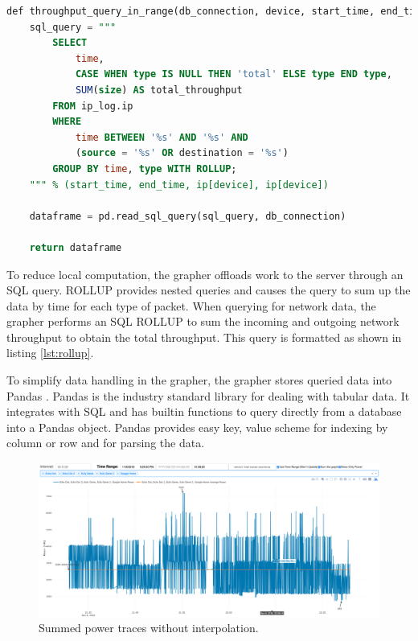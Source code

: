 \noindent
\begin{minipage}{\textwidth}
    \begin{lstlisting}[language=SQL, label={lst:rollup},caption={Efficient SQL query to obtain total Network throughput at each second.}]
    def throughput_query_in_range(db_connection, device, start_time, end_time):
    sql_query = """
        SELECT
            time,
            CASE WHEN type IS NULL THEN 'total' ELSE type END type,
            SUM(size) AS total_throughput
        FROM ip_log.ip
        WHERE
            time BETWEEN '%s' AND '%s' AND
            (source = '%s' OR destination = '%s')
        GROUP BY time, type WITH ROLLUP;
    """ % (start_time, end_time, ip[device], ip[device])

    dataframe = pd.read_sql_query(sql_query, db_connection)

    return dataframe
    \end{lstlisting}
\end{minipage}

To reduce local computation, the grapher offloads work to the server through an SQL query. ROLLUP provides nested queries and causes the query to sum up the data by time for each type of packet. When querying for network data, the grapher performs an SQL ROLLUP to sum the incoming and outgoing network throughput to obtain the total throughput. This query is formatted as shown in listing \ref{lst:rollup}.

To simplify data handling in the grapher, the grapher stores queried data into Pandas \cite{pandas}. Pandas is the industry standard library for dealing with tabular data. It integrates with SQL and has builtin functions to query directly from a database into a Pandas object. Pandas provides easy key, value scheme for indexing by column or row and for parsing the data.

\begin{figure}[H]
    \centering
    \includegraphics[width=1\textwidth]{figures/noninterpolated.png}
    \caption{Summed power traces without interpolation.}
    \label{fig:noninterpolated}
\end{figure}

